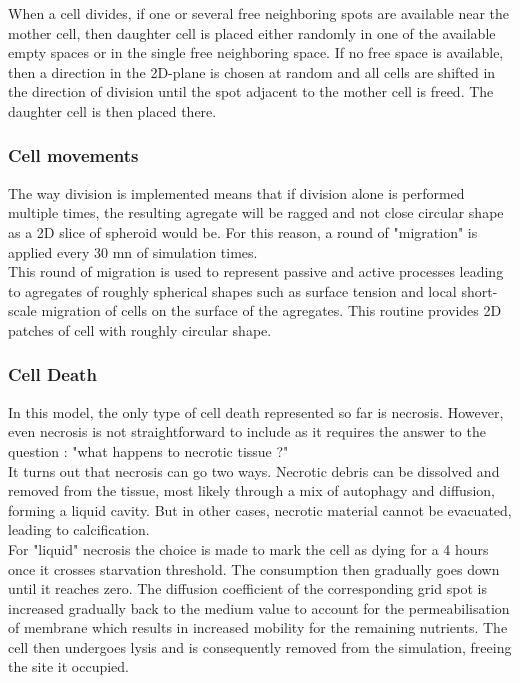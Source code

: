 \documentclass[11pt,a4paper]{article}
\begin{document}
When a cell divides, if one or several free neighboring spots are available near the mother cell, then daughter cell is placed either randomly in one of the available empty spaces or in the single free neighboring space. If no free space is available, then a direction in the 2D-plane is chosen at random and all cells are shifted in the direction of division until the spot adjacent to the mother cell is freed. The daughter cell is then placed there.\\


\subsubsection{Cell movements}
The way division is implemented means that if division alone is performed multiple times, the resulting agregate will be ragged and not  close circular shape as a 2D slice of spheroid would be. For this reason, a round of "migration" is applied every 30 mn of simulation times.\\

This round of migration is used to represent passive and active processes leading to agregates of roughly spherical shapes such as surface tension and local short-scale migration of cells on the surface of the agregates. This routine provides 2D patches of cell with roughly circular shape.\\


\subsubsection{Cell Death}
In this model, the only type of cell death represented so far is necrosis. However, even necrosis is not straightforward to include as it requires the answer to the question : "what happens to necrotic tissue ?"\\

It turns out that necrosis can go two ways. Necrotic debris can be dissolved and removed from the tissue, most likely through a mix of autophagy and diffusion, forming a liquid cavity. But in other cases, necrotic material cannot be evacuated, leading to calcification.\cite{Thim2010}\cite{YuMi2017}\\

For "liquid" necrosis the choice is made to mark the cell as dying for a 4 hours once it crosses starvation threshold. The consumption then gradually goes down until it reaches zero. The diffusion coefficient of the corresponding grid spot is increased gradually back to the medium value to account for the permeabilisation of membrane which results in increased mobility for the remaining nutrients. The cell then undergoes lysis and is consequently removed from the simulation, freeing the site it occupied.\\
\end{document}
